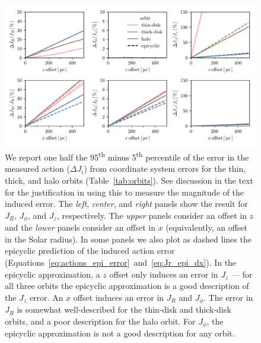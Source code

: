 \documentclass[twocolumn]{aastex62}
\newcommand{\uth}{\textsuperscript{th}}
\begin{document}
\begin{figure}
\begin{center}
\includegraphics[width=\textwidth]{fig/schmactions_many_orbits.pdf}
\end{center}
\caption{We report one half the 95\uth{} minus 5\uth{} percentile of the error
in the measured action ($\Delta J_i$) from coordinate system errors for the
thin, thick, and halo orbits (Table~\ref{tab:orbits}). See discussion in the
text for the justification in using this to measure the magnitude of the
induced error. The {\em left}, {\em center}, and {\em right} panels show the
result for $J_R$, $J_{\phi}$, and $J_z$, respectively. The {\em upper} panels
consider an offset in $z$ and the {\em lower} panels consider an offset in $x$
(equivalently, an offset in the Solar radius). In some panels we also plot as
dashed lines the epicyclic prediction of the induced action error
(Equations~\ref{eq:actions_epi_error}~and~\ref{eq:Jr_epi_dx}). In the
epicyclic approximation, a $z$ offset only induces an error in $J_z$ --- for
all three orbits the epicyclic approximation is a good description of the
$J_z$ error. An $x$ offset induces an error in $J_R$ and $J_{\phi}$. The error in
$J_R$ is somewhat well-described for the thin-disk and thick-disk orbits, and
a poor description for the halo orbit. For $J_{\phi}$, the epicyclic approximation
is not a good description for any orbit.}
\label{fig:many_orbit_wrong_ref}
\end{figure}
\end{document}
